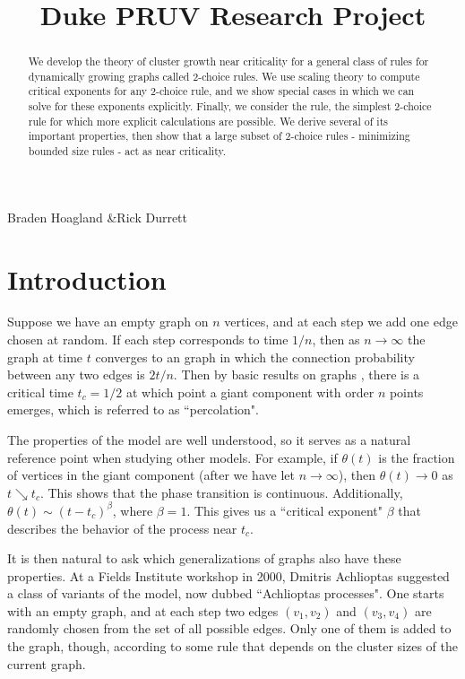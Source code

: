 \documentclass[twoside,10pt]{article}
\begin{document}

\title{Duke PRUV Research Project}{Braden Hoagland \quad\&\quad Rick Durrett}

\begin{abstract}
	We develop the theory of cluster growth near criticality for a general class of rules for dynamically growing graphs called 2-choice rules. We use scaling theory to compute critical exponents for any 2-choice rule, and we show special cases in which we can solve for these exponents explicitly. Finally, we consider the \ER rule, the simplest 2-choice rule for which more explicit calculations are possible. We derive several of its important properties, then show that a large subset of 2-choice rules - minimizing bounded size rules - act as \ER near criticality.
\end{abstract}

\section{Introduction}

Suppose we have an empty graph on $n$ vertices, and at each step we add one edge chosen at random. If each step corresponds to time $1/n$, then as $n\to \infty$ the graph at time $t$ converges to an \ER graph in which the connection probability between any two edges is $2t/n$. Then by basic results on \ER graphs \cite{ER}, there is a critical time $t_{c}=1/2$ at which point a giant component with order $n$ points emerges, which is referred to as ``percolation".

The properties of the \ER model are well understood, so it serves as a natural reference point when studying other models. For example, if $\theta(t)$ is the fraction of vertices in the giant component (after we have let $n\to \infty$), then $\theta(t)\to 0$ as $t\searrow t_{c}$. This shows that the phase transition is continuous. Additionally, $\theta(t) \sim (t-t_{c})^{\beta}$, where $\beta=1$. This gives us a ``critical exponent" $\beta$ that describes the behavior of the process near $t_{c}$.

It is then natural to ask which generalizations of \ER graphs also have these properties. At a Fields Institute workshop in 2000, Dmitris Achlioptas suggested a class of variants of the \ER model, now dubbed ``Achlioptas processes". One starts with an empty graph, and at each step two edges $(v_1,v_2)$ and $(v_3,v_4)$ are randomly chosen from the set of all possible edges. Only one of them is added to the graph, though, according to some rule that depends on the cluster sizes of the current graph.
\end{document}
